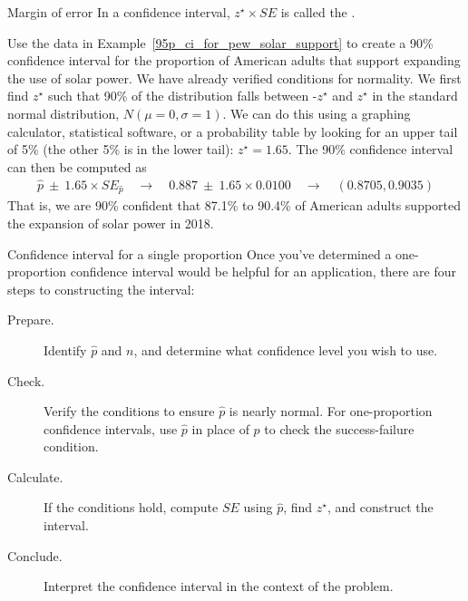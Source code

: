 \begin{onebox}{Margin of error}
  \label{marginOfErrorTermBox}%
  In a confidence interval, $z^{\star}\times SE$ is called the
  .
\end{onebox}

\begin{examplewrap}
\begin{nexample}{Use the data in
    Example~\ref{95p_ci_for_pew_solar_support} to
    create a 90\% confidence interval for the proportion of American
    adults that support expanding the use of solar power.
    We have already verified conditions for normality.}
  We first find $z^{\star}$ such that 90\% of the distribution falls
  between -$z^{\star}$ and $z^{\star}$ in the
  standard normal distribution, $N(\mu = 0, \sigma = 1)$.
  We can do this using a graphing calculator,
  statistical software, or a probability table by looking for an
  upper tail of 5\% (the other 5\% is in the lower tail):
  $z^{\star}=1.65$.
  The 90\% confidence interval can then be computed as
  \begin{align*}
  \hat{p}\ \pm\ 1.65 \times SE_{\hat{p}}
      \quad\to\quad 0.887\ \pm\ 1.65 \times 0.0100
      \quad\to\quad (0.8705, 0.9035)
  \end{align*}
  That is, we are 90\% confident that 87.1\% to 90.4\% of American
  adults supported the expansion of solar power in 2018.
\end{nexample}
\end{examplewrap}

\newcommand{\onepropconfintsummary}[0]{
\begin{onebox}{Confidence interval for a single proportion}
  Once you've determined a one-proportion confidence interval
  would be helpful for an application,
  there are four steps to constructing the interval:
  \begin{description}
  \item[Prepare.]
      Identify $\hat{p}$ and $n$, and determine what
      confidence level you wish to use.
  \item[Check.]
      Verify the conditions to ensure $\hat{p}$
      is nearly normal.
      For one-proportion confidence intervals,
      use $\hat{p}$ in place of $p$ to check
      the success-failure condition.
  \item[Calculate.]
      If the conditions hold, compute $SE$ using $\hat{p}$,
      find $z^{\star}$, and construct the interval.
  \item[Conclude.]
      Interpret the confidence interval in the context
      of the problem.
  \end{description}
\end{onebox}
}
\onepropconfintsummary{}


